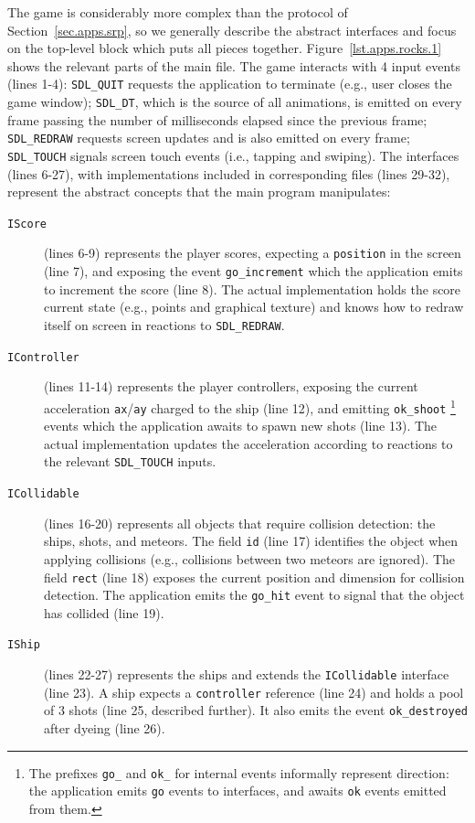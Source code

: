 \documentclass{sigplanconf}
\newcommand{\code}[1] {{\small{\texttt{#1}}}}
\newcommand{\1}{\;}
\newcommand{\2}{\;\;}
\newcommand{\3}{\;\;\;}
\newcommand{\5}{\;\;\;\;\;}
\begin{document}
The game is considerably more complex than the protocol of 
Section~\ref{sec.apps.srp}, so we generally describe the abstract interfaces 
and focus on the top-level block which puts all pieces together.
%
Figure~\ref{lst.apps.rocks.1} shows the relevant parts of the main file.
%
The game interacts with 4 input events (lines 1-4):
\code{SDL\_QUIT} requests the application to terminate (e.g., user closes the 
game window);
\code{SDL\_DT}, which is the source of all animations, is emitted on every 
frame passing the number of milliseconds elapsed since the previous frame;
\code{SDL\_REDRAW} requests screen updates and is also emitted on every frame;
\code{SDL\_TOUCH} signals screen touch events (i.e., tapping and swiping).
%
The interfaces (lines 6-27), with implementations included in corresponding 
files (lines 29-32), represent the abstract concepts that the main program 
manipulates:
\begin{description}
\item[\code{IScore}] (lines 6-9) represents the player scores, expecting a 
\code{position} in the screen (line 7), and exposing the event 
\code{go\_increment} which the application emits to increment the score (line 
8).
The actual implementation holds the score current state (e.g., points and 
graphical texture) and knows how to redraw itself on screen in reactions to 
\code{SDL\_REDRAW}.
\item[\code{IController}] (lines 11-14) represents the player controllers, 
exposing the current acceleration \code{ax}/\code{ay} charged to the ship (line 
12), and emitting \code{ok\_shoot}%
\footnote {
The prefixes \code{go\_} and \code{ok\_} for internal events informally 
represent direction: the application emits \code{go} events to interfaces, and 
awaits \code{ok} events emitted from them.
}
events which the application awaits to spawn new shots (line 13).
The actual implementation updates the acceleration according to reactions to 
the relevant \code{SDL\_TOUCH} inputs.
\item[\code{ICollidable}] (lines 16-20) represents all objects that require 
collision detection: the ships, shots, and meteors.
The field \code{id} (line 17) identifies the object when applying collisions 
(e.g., collisions between two meteors are ignored).
The field \code{rect} (line 18) exposes the current position and dimension for 
collision detection.
The application emits the \code{go\_hit} event to signal that the object has 
collided (line 19).
\item[\code{IShip}] (lines 22-27) represents the ships and extends the 
\code{ICollidable} interface (line 23).
A ship expects a \code{controller} reference (line 24) and holds a pool of 3 
shots (line 25, described further).
It also emits the event \code{ok\_destroyed} after dyeing (line 26).
\end{description}
\end{document}
